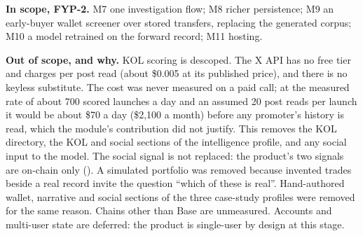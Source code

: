 \textbf{In scope, FYP-2.} M7 one investigation flow; M8 richer persistence; M9 an early-buyer wallet screener over stored transfers, replacing the generated corpus; M10 a model retrained on the forward record; M11 hosting.

\textbf{Out of scope, and why.} KOL scoring is descoped. The X API has no free tier and charges per post read (about \$0.005 at its published price), and there is no keyless substitute. The cost was never measured on a paid call; at the measured rate of about 700 scored launches a day and an assumed 20 post reads per launch it would be about \$70 a day (\$2,100 a month) before any promoter's history is read, which the module's contribution did not justify. This removes the KOL directory, the KOL and social sections of the intelligence profile, and any social input to the model. The social signal is not replaced: the product's two signals are on-chain only (). A simulated portfolio was removed because invented trades beside a real record invite the question ``which of these is real''. Hand-authored wallet, narrative and social sections of the three case-study profiles were removed for the same reason. Chains other than Base are unmeasured. Accounts and multi-user state are deferred: the product is single-user by design at this stage.

